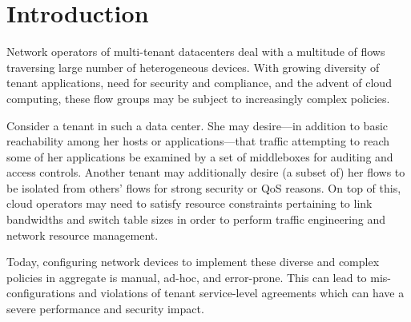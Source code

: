\section{Introduction}

Network operators of multi-tenant datacenters deal with a multitude of
flows traversing large number of heterogeneous devices. With growing
diversity of tenant applications, need for security and compliance,
and the advent of cloud computing, these flow groups may be subject to
increasingly complex policies.

Consider a tenant in such a data center. She may desire---in addition
to basic reachability among her hosts or applications---that traffic
attempting to reach some of her applications be examined by a set of
middleboxes for auditing and access controls. Another tenant may
additionally desire (a subset of) her flows to be isolated from
others' flows for strong security or QoS reasons. On top of this,
cloud operators may need to satisfy resource constraints pertaining to
link bandwidths and switch table sizes in order to perform traffic
engineering and network resource management.

Today, configuring network devices to implement these diverse
and complex policies in aggregate is manual, ad-hoc, and error-prone. 
This can lead to mis-configurations and violations of tenant
service-level agreements which can have a severe performance and
security impact.



